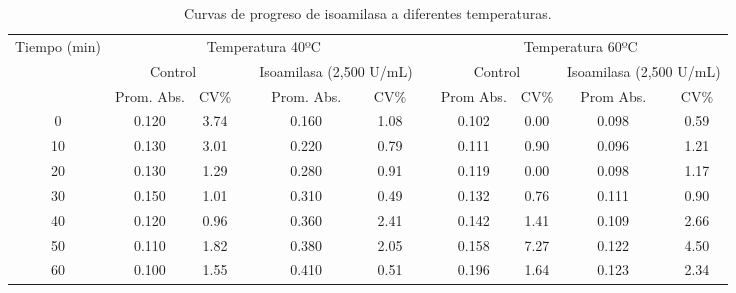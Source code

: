 \documentclass{article}
\begin{document}
\begin{table}[H]
	\centering
	\caption{Curvas de progreso de isoamilasa a diferentes temperaturas.}
	\begin{adjustbox}{width=\textwidth}
	\begin{tabular}{ccccccccccc}
		\toprule
		\multicolumn{1}{c}{\multirow{3}[6]{*}{Tiempo (min)}} & \multicolumn{5}{c}{Temperatura 40ºC}  &       & \multicolumn{4}{c}{Temperatura 60ºC} \\
		\cmidrule{2-6}\cmidrule{8-11}          & \multicolumn{2}{c}{Control} &       & \multicolumn{2}{c}{Isoamilasa (2,500 U/mL)} &       & \multicolumn{2}{c}{Control} & \multicolumn{2}{c}{Isoamilasa (2,500 U/mL)} \\
		\cmidrule{2-3}\cmidrule{5-6}\cmidrule{8-11}          & Prom. Abs. & CV\%  &       & Prom. Abs. & CV\%  &       & Prom Abs. & CV\%  & Prom Abs. & CV\% \\
		\midrule
		0     & 0.120 & 3.74  &       & 0.160 & 1.08  &       & 0.102 & 0.00  & 0.098 & 0.59 \\
		10    & 0.130 & 3.01  &       & 0.220 & 0.79  &       & 0.111 & 0.90  & 0.096 & 1.21 \\
		20    & 0.130 & 1.29  &       & 0.280 & 0.91  &       & 0.119 & 0.00  & 0.098 & 1.17 \\
		30    & 0.150 & 1.01  &       & 0.310 & 0.49  &       & 0.132 & 0.76  & 0.111 & 0.90 \\
		40    & 0.120 & 0.96  &       & 0.360 & 2.41  &       & 0.142 & 1.41  & 0.109 & 2.66 \\
		50    & 0.110 & 1.82  &       & 0.380 & 2.05  &       & 0.158 & 7.27  & 0.122 & 4.50 \\
		60    & 0.100 & 1.55  &       & 0.410 & 0.51  &       & 0.196 & 1.64  & 0.123 & 2.34 \\
		\bottomrule
	\end{tabular}%
	\end{adjustbox}
	\label{tab:c3}%
\end{table}%
\end{document}
